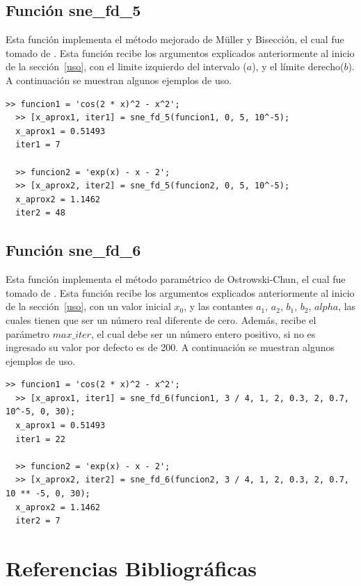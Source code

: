 \documentclass[12pt]{article}
\begin{document}
\subsection{Función sne\_fd\_5}
Esta función implementa el método mejorado de Müller y Bisección, el cual fue tomado de \cite{wu2005improved}. Esta función recibe los argumentos explicados anteriormente al inicio de la sección~\ref{uso}, con el limite izquierdo del intervalo ($a$), y el límite derecho($b$). A continuación se muestran algunos ejemplos de uso.

\begin{minipage}{\linewidth}
\begin{lstlisting}[frame = single]
  >> funcion1 = 'cos(2 * x)^2 - x^2';
  >> [x_aprox1, iter1] = sne_fd_5(funcion1, 0, 5, 10^-5);
  x_aprox1 = 0.51493
  iter1 = 7

  >> funcion2 = 'exp(x) - x - 2';
  >> [x_aprox2, iter2] = sne_fd_5(funcion2, 0, 5, 10^-5);
  x_aprox2 = 1.1462
  iter2 = 48
\end{lstlisting}
\end{minipage}

\subsection{Función sne\_fd\_6}
Esta función implementa el método paramétrico de Ostrowski-Chun, el cual fue tomado de \cite{cordero2015solving}. Esta función recibe los argumentos explicados anteriormente al inicio de la sección~\ref{uso}, con un valor inicial $x_{0}$, y las contantes $a_{1}$, $a_{2}$, $b_{1}$, $b_{2}$, $alpha$, las cuales tienen que ser un número real diferente de cero. Además, recibe el parámetro $max\_iter$, el cual debe ser un número entero positivo, si no es ingresado su valor por defecto es de 200.  A continuación se muestran algunos ejemplos de uso.

\begin{minipage}{\linewidth}
\begin{lstlisting}[frame = single]
  >> funcion1 = 'cos(2 * x)^2 - x^2';
  >> [x_aprox1, iter1] = sne_fd_6(funcion1, 3 / 4, 1, 2, 0.3, 2, 0.7, 10^-5, 0, 30);
  x_aprox1 = 0.51493
  iter1 = 22

  >> funcion2 = 'exp(x) - x - 2';
  >> [x_aprox2, iter2] = sne_fd_6(funcion2, 3 / 4, 1, 2, 0.3, 2, 0.7, 10 ** -5, 0, 30);
  x_aprox2 = 1.1462
  iter2 = 7
\end{lstlisting}
\end{minipage}

\newpage
\section{Referencias Bibliográficas}
\nocite{*}

\end{document}
